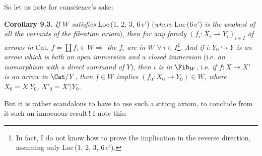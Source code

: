 
So let us note for conscience's sake:

\textbf{Corollary 9.3.} \textit{If $W$ satisfies} Loc\,(1, 2, 3, 6\,c$'$) (\textit{where} Loc\,(6\,c$'$) \textit{is the weakest of all the variants of the fibration axiom}), \textit{then for any family $(f_i : X_i\longrightarrow Y_i)_{i\in I}$ of arrows in} Cat, \textit{$f=\coprod f_i\in W\Longrightarrow$ the $f_i$ are in $W$ $\forall\ i\in I$}\footnote[47]{In fact, I do not know how to prove the implication in the reverse direction, assuming only Loc\,(1, 2, 3, 6\,c$'$).}. \textit{And if $i : Y_0\hookrightarrow Y$ is an arrow which is both an open immersion and a closed immersion} (i.e. \textit{an isomorphism with a direct summand of $Y$}), \textit{then $i$ is in} $\Fib_W$, i.e. \textit{if $f : X\longrightarrow X'$ is an arrow in} $\Cat/Y$, \textit{then $f\in W$ implies $(f_0 : X_0\longrightarrow Y_0)\in W$, where $X_0=X|Y_0$, $X'_0=X'|Y_0$.} %

But it is rather scandalous to have to use such a strong axiom, to conclude from it such an innocuous result\,! I note this:

